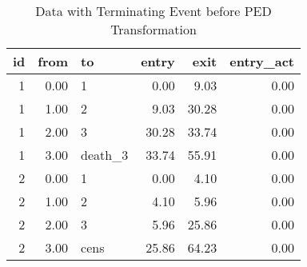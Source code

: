 \begin{table}[ht]
\centering
\begin{tabular}{rrlrrr}
  \toprule
id & from & to & entry & exit & entry\_act \\ 
  \midrule
  1 & 0.00 & 1 & 0.00 & 9.03 & 0.00 \\ 
    1 & 1.00 & 2 & 9.03 & 30.28 & 0.00 \\ 
    1 & 2.00 & 3 & 30.28 & 33.74 & 0.00 \\ 
    1 & 3.00 & death\_3 & 33.74 & 55.91 & 0.00 \\ 
    2 & 0.00 & 1 & 0.00 & 4.10 & 0.00 \\ 
    2 & 1.00 & 2 & 4.10 & 5.96 & 0.00 \\ 
    2 & 2.00 & 3 & 5.96 & 25.86 & 0.00 \\ 
    2 & 3.00 & cens & 25.86 & 64.23 & 0.00 \\ 
   \bottomrule
\end{tabular}
\caption{Data with Terminating Event before PED Transformation} 
\end{table}

